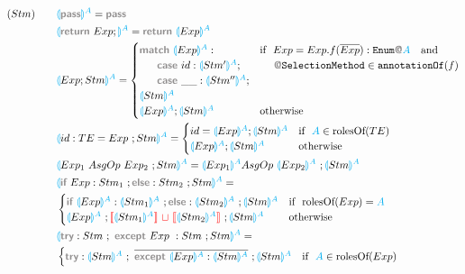 \documentclass[11pt]{jarticle}
\newcommand{\projection}[2]{{\color{cyan}\llparenthesis}#1{\color{cyan}\rrparenthesis^#2}}
\newcommand{\gray}[1]{\textbf{\textsf{\color{Gray}#1}}}
\newcommand{\cyan}[1]{\color{cyan}#1}
\newcommand{\nl}[1]{{\color{red}{\llbracket}}#1{\color{red}{\rrbracket}}} %
\newcommand{\mg}{~{\color{red}{\sqcup}}~} %
\begin{document}
\begin{alignat*}{2}
  &(Stm)~~~ &&\projection{\gray{pass}}{A} = \gray{pass}\\
  &&&\projection{\gray{return} ~ Exp;}{A} = \gray{return} ~ \projection{Exp}{A}\\
  &&&\projection{Exp;Stm}{A} =
  \begin{cases}
    \gray{match} ~\projection{Exp}{A}: & \text{if}~~Exp = Exp.f(\overline{Exp}):\texttt{Enum}\gray{@}{\cyan{A}}~~~\text{and}\\
    ~~~~~\gray{case} ~id: \projection{Stm'}{A}; &~~~~ \gray{@}\texttt{SelectionMethod} \in \texttt{annotationOf}(f)\\%
    ~~~~~\gray{case} ~\_\_: \projection{Stm''}{A}; \\
    \projection{Stm}{A}\\
    \projection{Exp}{A};\projection{Stm}{A} & \text{otherwise}\\
  \end{cases}\\
  &&& \projection{id:TE = Exp~;Stm}{A} =
  \begin{cases}
    id = \projection{Exp}{A};\projection{Stm}{A} & \text{if}~~ {\color{cyan}A} \in \text{rolesOf}(TE)\\
    \projection{Exp}{A};\projection{Stm}{A} & \text{otherwise}
  \end{cases}\\
  &&& \projection{Exp_1 ~AsgOp~ Exp_2 ~; Stm}{A} = \projection{Exp_1}{A} AsgOp~ \projection{Exp_2}{A} ~; \projection{Stm}{A} \\
  &&&\projection{\gray{if}~Exp:Stm_1~;\gray{else}:Stm_2 ~;Stm}{A}=\\
  &&&
  \begin{cases}
    \gray{if}~\projection{Exp}{A} : \projection{Stm_1}{A} ~; \gray{else}:\projection{Stm_2}{A} ~;\projection{Stm}{A} & \text{if}~~ \text{rolesOf}(Exp) = \cyan{A}\\
    \projection{Exp}{A} ~; \nl{\projection{Stm_1}{A}} \mg \nl{\projection{Stm_2}{A}} ~;\projection{Stm}{A} & \text{otherwise}
  \end{cases}\\
  &&&\projection{\gray{try}:Stm ~;~ \gray{except}~Exp~:Stm ~;Stm}{A} =\\
  &&&
  \begin{cases}
    \gray{try}:\projection{Stm}{A}~;~\overline{\gray{except}~ \projection{Exp}{A} : \projection{Stm}{A}}~;\projection{Stm}{A} & \text{if}~~ {\cyan{A}} \in \text{rolesOf}(Exp)\\
  \end{cases}\\
\end{alignat*}
\end{document}
